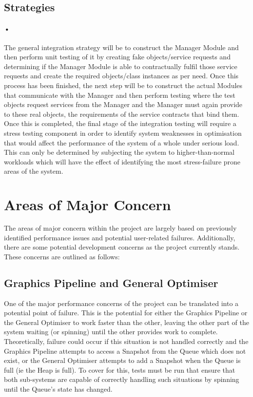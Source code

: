 \documentclass[11pt]{article}
\begin{document}
\subsection{Strategies}
\paragraph{•}
The general integration strategy will be to construct the Manager Module and then perform unit testing of it by creating fake objects/service requests and determining if the Manager Module is able to contractually fulfil those service requests and create the required objects/class instances as per need. Once this process has been finished, the next step will be to construct the actual Modules that communicate with the Manager and then perform testing where the test objects request services from the Manager and the Manager must again provide to these real objects, the requirements of the service contracts that bind them. Once this is completed, the final stage of the integration testing will require a stress testing component in order to identify system weaknesses in optimisation that would affect the performance of the system of a whole under serious load. This can only be determined by subjecting the system to higher-than-normal workloads which will have the effect of identifying the most stress-failure prone areas of the system.

\section{Areas of Major Concern}
The areas of major concern within the project are largely based on previously identified performance issues and potential user-related failures. Additionally, there are some potential development concerns as the project currently stands. These concerns are outlined as follows:
\subsection{Graphics Pipeline and General Optimiser}
One of the major performance concerns of the project can be translated into a potential point of failure. This is the potential for either the Graphics Pipeline or the General Optimiser to work faster than the other, leaving the other part of the system waiting (or spinning) until the other provides work to complete. Theoretically, failure could occur if this situation is not handled correctly and the Graphics Pipeline attempts to access a Snapshot from the Queue which does not exist, or the General Optimiser attempts to add a Snapshot when the Queue is full (ie the Heap is full). 
\newline To cover for this, tests must be run that ensure that both sub-systems are capable of correctly handling such situations by spinning until the Queue's state has changed.
\end{document}

